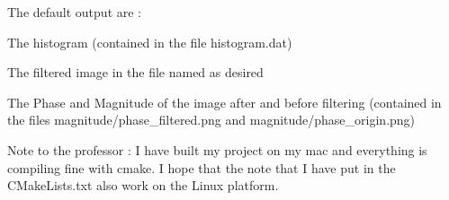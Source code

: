 The default output are \+:
\begin{DoxyItemize}
\item The histogram (contained in the file histogram.\+dat)
\item The filtered image in the file named as desired
\item The Phase and Magnitude of the image after and before filtering (contained in the files magnitude/phase\+\_\+filtered.\+png and magnitude/phase\+\_\+origin.\+png)
\end{DoxyItemize}

Note to the professor \+: I have built my project on my mac and everything is compiling fine with cmake. I hope that the note that I have put in the C\+Make\+Lists.\+txt also work on the Linux platform. 
